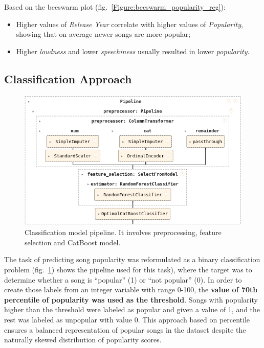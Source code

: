 Based on the beeswarm plot (fig.~\ref{Figure:beeswarm_popularity_reg}):
\begin{itemize}
  \item Higher values of \textit{Release Year} correlate with higher values of
    \textit{Popularity}, showing that on average newer songs are more
    popular;
  \item Higher \textit{loudness} and lower \textit{speechiness}
    usually resulted in lower \textit{popularity}.
\end{itemize}



\subsection{Classification Approach}

\begin{center}
\begin{figure}[H]
  \centering
  \includegraphics[width=6in]{img/clf_pipeline.png}
  \caption{Classification model pipeline. It involves preprocessing, feature
  selection and CatBoost model.}
  \label{Figure:clf_pipeline}
\end{figure}
\end{center}

The task of predicting song popularity was reformulated as a binary
classification problem (fig.~\ref{Figure:clf_pipeline}) shows the pipeline used
for this task), where the target was to determine whether a song is ``popular''
(1) or ``not popular'' (0). In order to create those labels from an integer
variable with range 0-100, the \textbf{value of 70th percentile of popularity
was used as the threshold}. Songs with popularity higher than the threshold
were labeled as popular and given a value of 1, and the rest was labeled as
unpopular with value 0. This approach based on percentile ensures a balanced
representation of popular songs in the dataset despite the naturally skewed
distribution of popularity scores.

